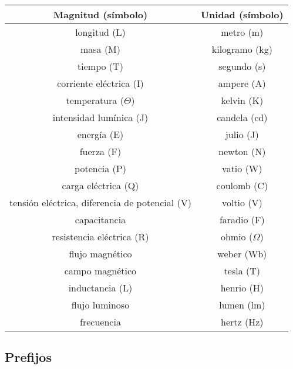 \begin{tabular}{|c|c|}
\hline 
Magnitud (símbolo) & Unidad (símbolo) \\ 
\hline 
longitud (L) & metro (m) \\ 
\hline 
masa (M) & kilogramo (kg) \\ 
\hline 
tiempo (T) & segundo (s) \\ 
\hline 
corriente eléctrica (I) & ampere (A) \\ 
\hline 
temperatura ($ \Theta $) & kelvin (K) \\ 
\hline 
intensidad lumínica (J) & candela (cd) \\ 
\hline 
energía (E) & julio (J) \\ 
\hline 
fuerza (F) & newton (N) \\ 
\hline 
potencia (P) & vatio (W) \\ 
\hline 
carga eléctrica (Q) & coulomb (C) \\ 
\hline 
tensión eléctrica, diferencia de potencial (V) & voltio (V) \\ 
\hline 
capacitancia & faradio (F) \\ 
\hline 
resistencia eléctrica (R) & ohmio ($ \Omega $) \\ 
\hline 
flujo magnético & weber (Wb) \\ 
\hline 
campo magnético & tesla (T) \\ 
\hline 
inductancia (L) & henrio (H) \\ 
\hline 
flujo luminoso & lumen (lm) \\ 
\hline
frecuencia & hertz (Hz) \\ 
\hline
\end{tabular} 

\subsection{Prefijos}\label{section:prefijos}

